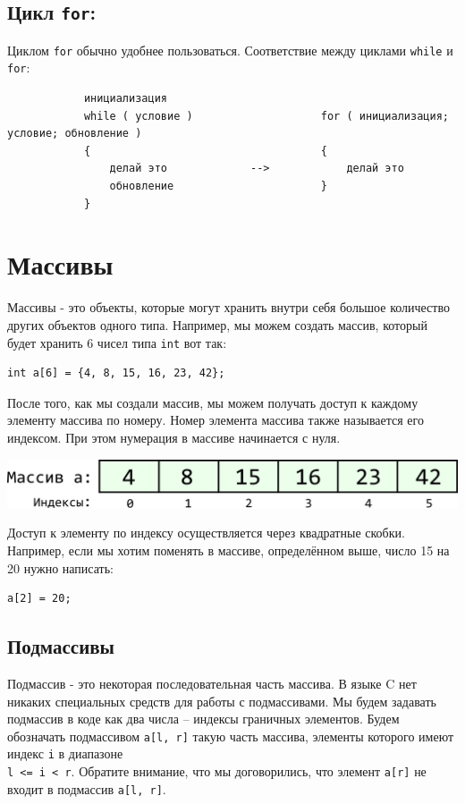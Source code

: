 \documentclass{article}
\begin{document}
\subsection*{Цикл \texttt{for}:}
Циклом \texttt{for} обычно удобнее пользоваться. Соответствие между циклами \texttt{while} и \texttt{for}: \\

\begin{lstlisting}
            инициализация
            while ( условие )                    for ( инициализация; условие; обновление )
            {                                    {        
                делай это             -->            делай это                       
                обновление                       }                     
            }                                                
\end{lstlisting}


\section*{Массивы}
Массивы - это объекты, которые могут хранить внутри себя большое количество других объектов одного типа.
Например, мы можем создать массив, который будет хранить 6 чисел типа \texttt{int} вот так:

\lstset{
  xleftmargin=.3\textwidth, xrightmargin=.2\textwidth
}
\begin{lstlisting}
int a[6] = {4, 8, 15, 16, 23, 42};
\end{lstlisting}

После того, как мы создали массив, мы можем получать доступ к каждому элементу массива по номеру. Номер
элемента массива также называется его индексом. При этом нумерация в массиве начинается с нуля.
\begin{center}
\includegraphics[scale=0.8]{../images/array_indexes.png}
\end{center}
Доступ к элементу по индексу осуществляется через квадратные скобки. Например, если мы хотим поменять в массиве, определённом выше, число 15 на 20 нужно написать:
\begin{lstlisting}
a[2] = 20;
\end{lstlisting}



\subsection*{Подмассивы}
Подмассив - это некоторая последовательная часть массива. В языке C нет никаких специальных средств для работы с подмассивами. Мы будем задавать подмассив в коде как два числа -- индексы граничных элементов. Будем обозначать подмассивом \texttt{a[l, r]} такую часть массива, элементы которого имеют индекс \texttt{i} в диапазоне \\
\texttt{l <= i < r}. Обратите внимание, что мы договорились, что элемент \texttt{a[r]} не входит в подмассив \texttt{a[l, r]}.\\
\end{document}
